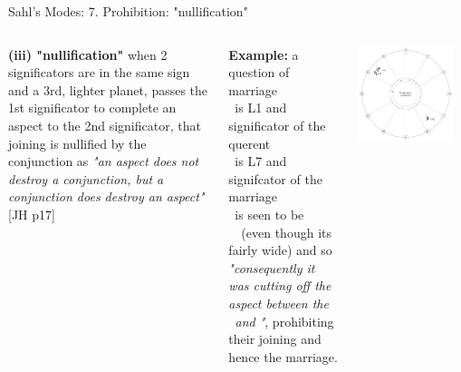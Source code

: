 \begin{frame}[t]{Sahl's Modes: 7. Prohibition: "nullification"}
\begin{columns}[T, onlytextwidth]
\vspace{0.5cm}
\textbf{(iii) "nullification"} when 2 significators are in the same sign and a 3rd, lighter planet, passes the 1st significator to complete an aspect to the 2nd significator, that joining is nullified by the conjunction as \textsl{"an aspect does not destroy a conjunction, but a conjunction does destroy an aspect"} [JH p17]

\vspace{0.25cm}
\textbf{Example:} a question of marriage \\
\ul
\Moon\ is L1 and significator of the querent \\
\Saturn\ is L7 and signifcator of the marriage \\
\Mars\ is seen to be \Conjunction\ \Saturn\ (even though its fairly wide) and so \textsl{"consequently it was cutting off the aspect between the \Moon\ and \Saturn"}, prohibiting their joining and hence the marriage.

\begin{center}
{\includegraphics[width=0.9\textwidth]{charts/64-nullification}} \\
\end{center}
\end{columns}
\end{frame}
